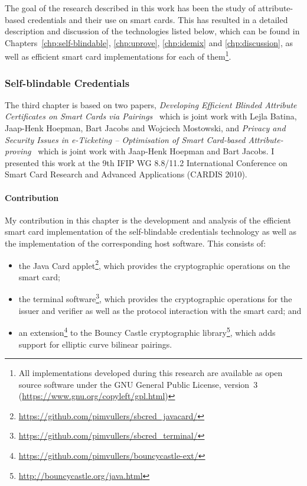 The goal of the research described in this work has been the study of
attribute-based credentials and their use on smart cards. This has resulted in a
detailed description and discussion of the technologies listed below, which can
be found in Chapters~\ref{chp:self-blindable}, \ref{chp:uprove},
\ref{chp:idemix} and \ref{chp:discussion}, as well as efficient smart card
implementations for each of them\footnote{All implementations developed during
this research are available as open source software under the GNU General Public
License, version~3 (\url{https://www.gnu.org/copyleft/gpl.html})}.

\subsubsection{Self-blindable Credentials}

The third chapter is based on two papers, \emph{Developing Efficient Blinded
Attribute Certificates on Smart Cards via Pairings}~\cite{BatinaHJMV10} which
is joint work with Lejla Batina, Jaap-Henk Hoepman, Bart Jacobs and Wojciech
Mostowski, and \emph{Privacy and Security Issues in e-Ticketing -- Optimisation
of Smart Card-based Attribute-proving}~\cite{HoepmanJV10} which is joint work
with Jaap-Henk Hoepman and Bart Jacobs. I presented this work at the 9th IFIP WG
8.8/11.2 International Conference on Smart Card Research and Advanced
Applications (CARDIS 2010).

\paragraph{Contribution}

My contribution in this chapter is the development and analysis of the efficient
smart card implementation of the self-blindable credentials technology as well
as the implementation of the corresponding host software. This consists of:
\begin{itemize}
  \item the Java Card applet\footnote{\url{https://github.com/pimvullers/sbcred_javacard/}},
    which provides the cryptographic operations on the smart card;
  \item the terminal software\footnote{\url{https://github.com/pimvullers/sbcred_terminal/}},
    which provides the cryptographic operations for the issuer and verifier as
    well as the protocol interaction with the smart card; and
  \item an extension\footnote{\url{https://github.com/pimvullers/bouncycastle-ext/}}
    to the Bouncy Castle cryptographic library\footnote{\url{http://bouncycastle.org/java.html}},
    which adds support for elliptic curve bilinear pairings.
\end{itemize}

